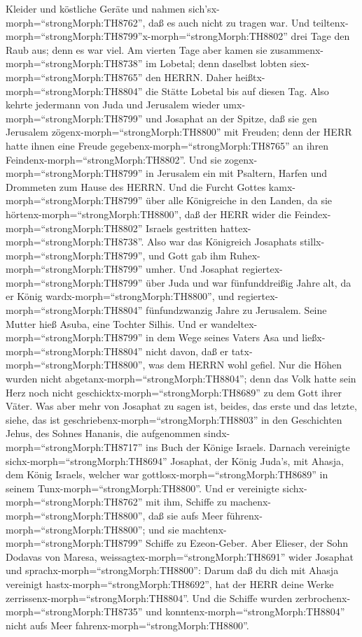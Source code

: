 Kleider und köstliche Geräte und nahmen
sich'sx-morph=``strongMorph:TH8762'', daß es auch nicht zu tragen war.
Und teiltenx-morph=``strongMorph:TH8799''x-morph=``strongMorph:TH8802''
drei Tage den Raub aus; denn es war viel.  Am vierten Tage
aber kamen sie zusammenx-morph=``strongMorph:TH8738'' im Lobetal; denn
daselbst lobten siex-morph=``strongMorph:TH8765'' den HERRN. Daher
heißtx-morph=``strongMorph:TH8804'' die Stätte Lobetal bis auf diesen
Tag.  Also kehrte jedermann von Juda und Jerusalem wieder
umx-morph=``strongMorph:TH8799'' und Josaphat an der Spitze, daß sie gen
Jerusalem zögenx-morph=``strongMorph:TH8800'' mit Freuden; denn der HERR
hatte ihnen eine Freude gegebenx-morph=``strongMorph:TH8765'' an ihren
Feindenx-morph=``strongMorph:TH8802''.  Und sie
zogenx-morph=``strongMorph:TH8799'' in Jerusalem ein mit Psaltern,
Harfen und Drommeten zum Hause des HERRN.  Und die Furcht
Gottes kamx-morph=``strongMorph:TH8799'' über alle Königreiche in den
Landen, da sie hörtenx-morph=``strongMorph:TH8800'', daß der HERR wider
die Feindex-morph=``strongMorph:TH8802'' Israels gestritten
hattex-morph=``strongMorph:TH8738''.  Also war das
Königreich Josaphats stillx-morph=``strongMorph:TH8799'', und Gott gab
ihm Ruhex-morph=``strongMorph:TH8799'' umher.  Und Josaphat
regiertex-morph=``strongMorph:TH8799'' über Juda und war fünfunddreißig
Jahre alt, da er König wardx-morph=``strongMorph:TH8800'', und
regiertex-morph=``strongMorph:TH8804'' fünfundzwanzig Jahre zu
Jerusalem. Seine Mutter hieß Asuba, eine Tochter Silhis. 
Und er wandeltex-morph=``strongMorph:TH8799'' in dem Wege seines Vaters
Asa und ließx-morph=``strongMorph:TH8804'' nicht davon, daß er
tatx-morph=``strongMorph:TH8800'', was dem HERRN wohl gefiel.
 Nur die Höhen wurden nicht
abgetanx-morph=``strongMorph:TH8804''; denn das Volk hatte sein Herz
noch nicht geschicktx-morph=``strongMorph:TH8689'' zu dem Gott ihrer
Väter.  Was aber mehr von Josaphat zu sagen ist, beides,
das erste und das letzte, siehe, das ist
geschriebenx-morph=``strongMorph:TH8803'' in den Geschichten Jehus, des
Sohnes Hananis, die aufgenommen sindx-morph=``strongMorph:TH8717'' ins
Buch der Könige Israels.  Darnach vereinigte
sichx-morph=``strongMorph:TH8694'' Josaphat, der König Juda's, mit
Ahasja, dem König Israels, welcher war
gottlosx-morph=``strongMorph:TH8689'' in seinem
Tunx-morph=``strongMorph:TH8800''.  Und er vereinigte
sichx-morph=``strongMorph:TH8762'' mit ihm, Schiffe zu
machenx-morph=``strongMorph:TH8800'', daß sie aufs Meer
führenx-morph=``strongMorph:TH8800''; und sie
machtenx-morph=``strongMorph:TH8799'' Schiffe zu Ezeon-Geber.
 Aber Elieser, der Sohn Dodavas von Maresa,
weissagtex-morph=``strongMorph:TH8691'' wider Josaphat und
sprachx-morph=``strongMorph:TH8800'': Darum daß du dich mit Ahasja
vereinigt hastx-morph=``strongMorph:TH8692'', hat der HERR deine Werke
zerrissenx-morph=``strongMorph:TH8804''. Und die Schiffe wurden
zerbrochenx-morph=``strongMorph:TH8735'' und
konntenx-morph=``strongMorph:TH8804'' nicht aufs Meer
fahrenx-morph=``strongMorph:TH8800''.

